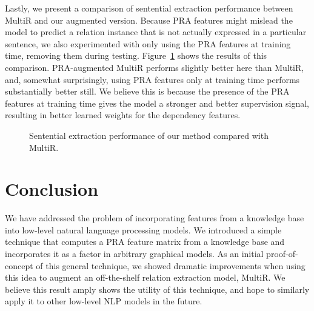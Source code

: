 \documentclass[11pt,a4paper]{article}
\newcommand{\figref}[1]{Figure~\ref{fig:#1}}
\begin{document}
Lastly, we present a comparison of sentential extraction performance between
MultiR and our augmented version.  Because PRA features might mislead the model
to predict a relation instance that is not actually expressed in a particular
sentence, we also experimented with only using the PRA features at training
time, removing them during testing.  \figref{sentential-comparison} shows the
results of this comparison.  PRA-augmented MultiR performs slightly better here
than MultiR, and, somewhat surprisingly, using PRA features only at training
time performs substantially better still.  We believe this is because the
presence of the PRA features at training time gives the model a stronger and
better supervision signal, resulting in better learned weights for the
dependency features.

\begin{figure}
  \centering
  \caption{Sentential extraction performance of our method compared with
  MultiR.}
  \label{fig:sentential-comparison}
\end{figure}

\section{Conclusion}

We have addressed the problem of incorporating features from a knowledge base
into low-level natural language processing models.  We introduced a simple
technique that computes a PRA feature matrix from a knowledge base and
incorporates it as a factor in arbitrary graphical models.  As an initial
proof-of-concept of this general technique, we showed dramatic improvements
when using this idea to augment an off-the-shelf relation extraction model,
MultiR.  We believe this result amply shows the utility of this technique, and
hope to similarly apply it to other low-level NLP models in the future.



\end{document}
